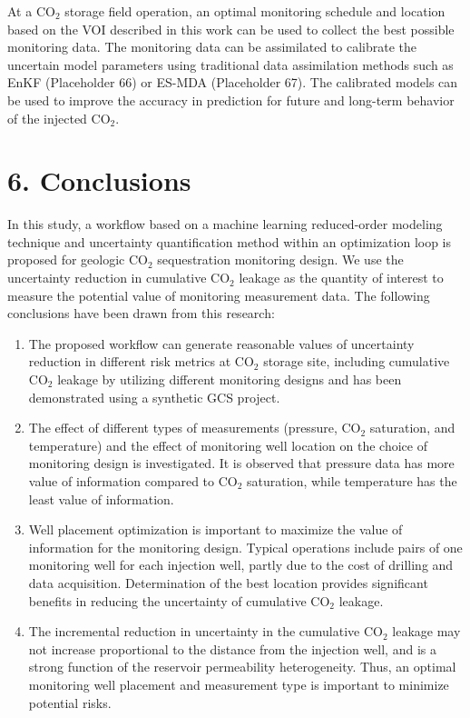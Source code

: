 \documentclass[10pt, twoside]{article}
\begin{document}
At a CO$_2$ storage field operation, an optimal monitoring schedule and location based on the VOI described in this work can be used to collect the best possible monitoring data. The monitoring data can be assimilated to calibrate the uncertain model parameters using traditional data assimilation methods such as EnKF (Placeholder 66) or ES-MDA (Placeholder 67). The calibrated models can be used to improve the accuracy in prediction for future and long-term behavior of the injected CO$_2$.

\section*{\textbf{6. Conclusions}}
In this study, a workflow based on a machine learning reduced-order modeling technique and uncertainty quantification method within an optimization loop is proposed for geologic CO$_2$ sequestration monitoring design. We use the uncertainty reduction in cumulative CO$_2$ leakage as the quantity of interest to measure the potential value of monitoring measurement data. The following conclusions have been drawn from this research:

\begin{enumerate}
    \item The proposed workflow can generate reasonable values of uncertainty reduction in different risk metrics at CO$_2$ storage site, including cumulative CO$_2$ leakage by utilizing different monitoring designs and has been demonstrated using a synthetic GCS project.
    \item The effect of different types of measurements (pressure, CO$_2$ saturation, and temperature) and the effect of monitoring well location on the choice of monitoring design is investigated. It is observed that pressure data has more value of information compared to CO$_2$ saturation, while temperature has the least value of information.
    \item Well placement optimization is important to maximize the value of information for the monitoring design. Typical operations include pairs of one monitoring well for each injection well, partly due to the cost of drilling and data acquisition. Determination of the best location provides significant benefits in reducing the uncertainty of cumulative CO$_2$ leakage.
    \item The incremental reduction in uncertainty in the cumulative CO$_2$ leakage may not increase proportional to the distance from the injection well, and is a strong function of the reservoir permeability heterogeneity. Thus, an optimal monitoring well placement and  measurement type is important to minimize potential risks.
\end{enumerate}
\end{document}
